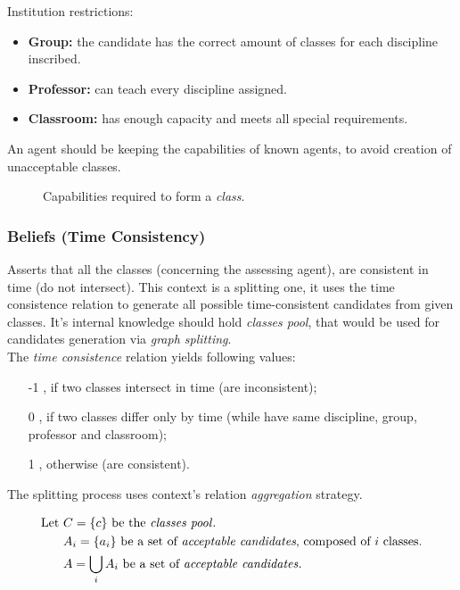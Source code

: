Institution restrictions:
\begin{itemize}
\item \textbf{Group:} the candidate has the correct amount of classes for each
  discipline inscribed.
\item \textbf{Professor:} can teach every discipline assigned.
\item \textbf{Classroom:} has enough capacity and meets all special requirements.
\end{itemize}

An agent should be keeping the capabilities of known agents, to avoid creation
of unacceptable classes.

\begin{figure}[h]
  \centering
  
  \caption{Capabilities required to form a \emph{class}.}
  \label{fig:capabilities}
\end{figure}


\subsubsection{Beliefs (Time Consistency)}

Asserts that all the classes (concerning the assessing agent), are consistent in
time (do not intersect). This context is a splitting one, it uses the time
consistence relation to generate all possible time-consistent candidates from
given classes. It's internal knowledge should hold \emph{classes pool}, that
would be used for candidates generation via \emph{graph splitting}.
\\

The \emph{time consistence} relation yields following values:
\begin{itemize}[leftmargin=2cm]
  \item[-1], if two classes intersect in time (are inconsistent);
  \item[0], if two classes differ only by time
            (while have same discipline, group, professor and classroom);
  \item[1], otherwise (are consistent).
\end{itemize}


The splitting process uses context's relation \emph{aggregation} strategy.

\begin{align*}
  \mbox{Let } & C=\lbrace c \rbrace \text{ be the \emph{classes pool}}.\\
            ~ & A_i=\lbrace a_i \rbrace \text{ be a set of \emph{acceptable candidates},
                                         composed of } i \text{ classes.}\\
            ~ & A=\bigcup\limits_{i} A_i \text{ be a set of \emph{acceptable candidates}}.
\end{align*}

